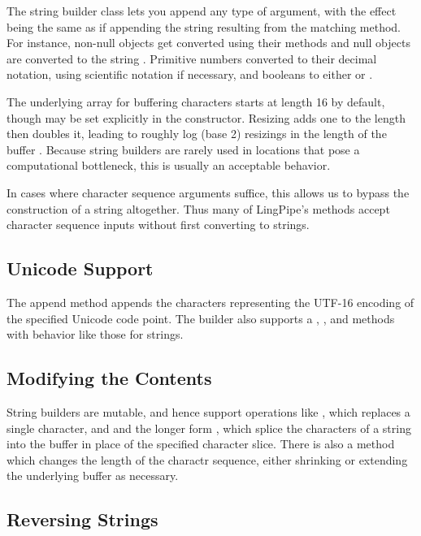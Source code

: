 The string builder class lets you append any type of argument, with
the effect being the same as if appending the string resulting from
the matching  method.  For instance, non-null
objects get converted using their  methods and null
objects are converted to the string .  Primitive
numbers converted to their decimal notation, using scientific notation
if necessary, and booleans to either  or
.

The underlying array for buffering characters starts at length 16 by
default, though may be set explicitly in the constructor.  Resizing
adds one to the length then doubles it, leading to roughly log (base
2) resizings in the length of the buffer .  Because string builders are rarely used in locations
that pose a computational bottleneck, this is usually an acceptable
behavior.

In cases where character sequence arguments suffice, this allows us to
bypass the construction of a string altogether.  Thus many of
LingPipe's methods accept character sequence inputs without first
converting to strings.

\subsection{Unicode Support}

The append method  appends the characters
representing the UTF-16 encoding of the specified Unicode code point.
The builder also supports a , ,
and  methods with behavior like those for strings.

\subsection{Modifying the Contents}

String builders are mutable, and hence support operations like
, which replaces a single character, and
 and the longer form
, which splice the characters of a
string into the buffer in place of the specified character slice.
There is also a  method which changes the length
of the charactr sequence, either shrinking or extending the underlying
buffer as necessary.

\subsection{Reversing Strings}

